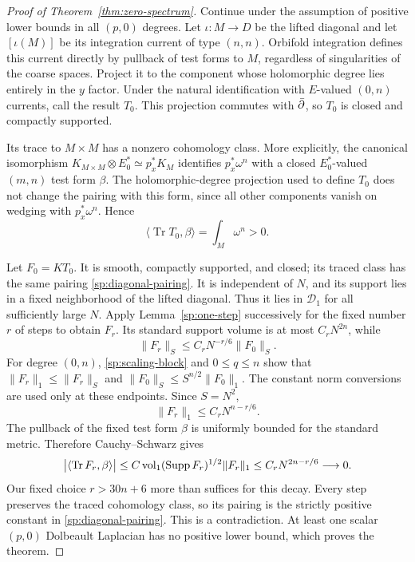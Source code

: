 \begin{proof}[Proof of Theorem~\ref{thm:zero-spectrum}]
Continue under the assumption of positive lower bounds in all $(p,0)$
degrees.  Let $\iota:M\to D$ be the lifted diagonal and let
$[\iota(M)]$ be its integration current of type $(n,n)$.  Orbifold
integration defines this current directly by pullback of test forms to
$M$, regardless of singularities of the coarse spaces.
Project it to the component whose holomorphic degree lies entirely in
the $y$ factor.  Under the natural identification with $E$-valued
$(0,n)$ currents, call the result $T_0$.  This projection commutes with
$\bar\partial$, so $T_0$ is closed and compactly supported.

Its trace to $M\times M$ has a nonzero cohomology class.  More
explicitly, the canonical isomorphism
$K_{M\times M}\otimes E_0^*\simeq p_x^*K_M$ identifies
$p_x^*\omega^n$ with a closed $E_0^*$-valued $(m,n)$ test form $\beta$.
The holomorphic-degree projection used to define $T_0$ does not change
the pairing with this form, since all other components vanish on
wedging with $p_x^*\omega^n$.  Hence
\begin{equation}\label{sp:diagonal-pairing}
 \langle\operatorname{Tr}T_0,\beta\rangle
 =\int_M\omega^n>0.
\end{equation}

Let $F_0=KT_0$.  It is smooth, compactly supported, and closed; its
traced class has the same pairing \eqref{sp:diagonal-pairing}.  It is
independent of $N$, and its support lies in a fixed neighborhood of the
lifted diagonal.  Thus it lies in $\mathcal D_1$ for all sufficiently
large $N$.  Apply Lemma~\ref{sp:one-step} successively for the fixed
number $r$ of steps to obtain $F_r$.  Its standard support volume is
at most $C_rN^{2n}$, while
\[
 \|F_r\|_S\le C_rN^{-r/6}\|F_0\|_S.
\]
For degree $(0,n)$, \eqref{sp:scaling-block} and $0\le q\le n$ show
that $\|F_r\|_1\le\|F_r\|_S$ and
$\|F_0\|_S\le S^{n/2}\|F_0\|_1$.  The constant norm conversions
are used only at these endpoints.  Since $S=N^2$,
\[
 \|F_r\|_1\le C_rN^{n-r/6}.
\]
The pullback of the fixed test form $\beta$ is uniformly bounded for
the standard metric.  Therefore Cauchy--Schwarz gives
\[
 \bigl|\langle\operatorname{Tr}F_r,\beta\rangle\bigr|
 \le C\operatorname{vol}_1(\operatorname{Supp} F_r)^{1/2}\|F_r\|_1
 \le C_rN^{2n-r/6}\longrightarrow0.
\]
Our fixed choice $r>30n+6$ more than suffices for this decay.  Every
step preserves the traced cohomology class, so its pairing is the
strictly positive constant in \eqref{sp:diagonal-pairing}.  This is a
contradiction.  At least one scalar $(p,0)$ Dolbeault Laplacian has no
positive lower bound, which proves the theorem.
\end{proof}
